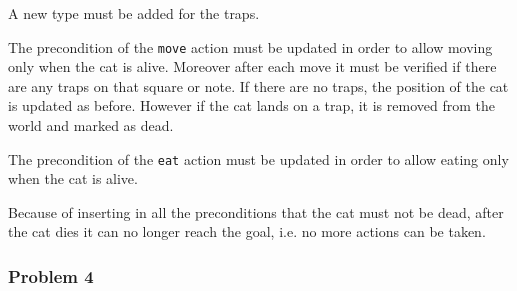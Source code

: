 A new type must be added for the traps.



The precondition of the \verb|move| action must be updated in order to allow moving only when the cat is alive. Moreover after each move it must be verified if there are any traps on that square or note. If there are no traps, the position of the cat is updated as before. However if the cat lands on a trap, it is removed from the world and marked as dead.



The precondition of the \verb|eat| action must be updated in order to allow eating only when the cat is alive.



Because of inserting in all the preconditions that the cat must not be dead, after the cat dies it can no longer reach the goal, i.e. no more actions can be taken.


\subsubsection{Problem 4}

